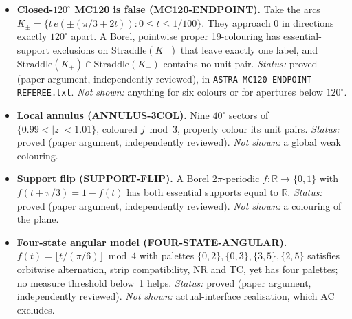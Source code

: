 \documentclass[11pt]{article}
\theoremstyle{definition}
\theoremstyle{remark}
\begin{document}
\begin{itemize}
\item \textbf{Closed-$120^\circ$ MC120 is false (MC120-ENDPOINT).}
Take the arcs $K_\pm=\{t\,e(\pm(\pi/3+2t)):0\le t\le 1/100\}$. They approach
$0$ in directions exactly $120^\circ$ apart. A Borel, pointwise proper
19-colouring has essential-support exclusions on $\mathrm{Straddle}(K_\pm)$
that leave exactly one label, and
$\mathrm{Straddle}(K_+)\cap\mathrm{Straddle}(K_-)$ contains no unit pair.
\emph{Status:} proved (paper argument, independently reviewed), in
\texttt{ASTRA-\allowbreak{}MC120-\allowbreak{}ENDPOINT-\allowbreak{}REFEREE.\allowbreak{}txt}.
\emph{Not shown:} anything for six colours or for apertures below
$120^\circ$.

\item \textbf{Local annulus (ANNULUS-3COL).} Nine $40^\circ$ sectors of
$\{0.99<|z|<1.01\}$, coloured $j\bmod 3$, properly colour its unit pairs.
\emph{Status:} proved (paper argument, independently reviewed).
\emph{Not shown:} a global weak colouring.

\item \textbf{Support flip (SUPPORT-FLIP).} A Borel $2\pi$-periodic
$f:\mathbb{R}\to\{0,1\}$ with $f(t+\pi/3)=1-f(t)$ has both essential supports
equal to $\mathbb{R}$. \emph{Status:} proved (paper argument, independently
reviewed). \emph{Not shown:} a colouring of the plane.

\item \textbf{Four-state angular model (FOUR-STATE-ANGULAR).}
$f(t)=\lfloor t/(\pi/6)\rfloor\bmod 4$ with palettes
$\{0,2\},\{0,3\},\{3,5\},\{2,5\}$ satisfies orbitwise alternation, strip
compatibility, NR and TC, yet has four palettes; no measure threshold below~1
helps. \emph{Status:} proved (paper argument, independently reviewed).
\emph{Not shown:} actual-interface realisation, which AC excludes.


\end{itemize}
\end{document}
